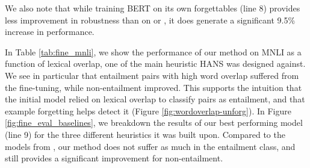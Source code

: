 We also note that while training BERT on its own forgettables (line 8) provides less improvement in robustness than on \flstm or \fbow, it does generate a significant 9.5\% increase in performance.

In Table \ref{tab:fine_mnli}, we show the performance of our method on MNLI as a function of lexical overlap, one of the main heuristic HANS was designed against. We see in particular that entailment pairs with high word overlap suffered from the fine-tuning, while non-entailment improved. This supports the intuition that the initial model relied on lexical overlap to classify pairs as entailment, and that example forgetting helps detect it (Figure \ref{fig:wordoverlap-unforg}). In Figure \ref{fig:fine_eval_baselines}, we breakdown the results of our best performing model (line 9) for the three different heuristics it was built upon. Compared to the models from \citet{clark2019dont,mahabadi2019simple}, our method does not suffer as much in the entailment class, and still provides a significant improvement for non-entailment.


